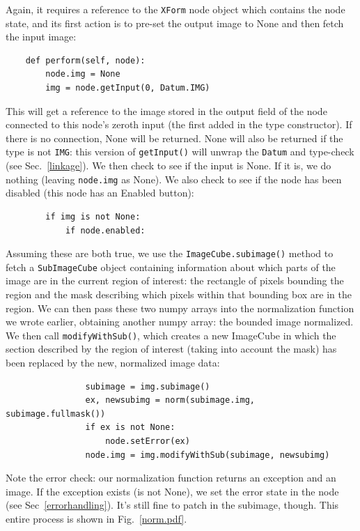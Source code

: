 Again, it requires a reference to the
\texttt{XForm} node object which contains the node state, and its first action
is to pre-set the output image to None and then fetch the input image:
\begin{lstlisting}
    def perform(self, node):
        node.img = None    
        img = node.getInput(0, Datum.IMG)
\end{lstlisting}
This will get a reference to the image stored in the output field of the node
connected to this node's zeroth input (the first added in the type
constructor). If there is no connection, None will be returned. None will also
be returned if the type is not \texttt{IMG}: this version of \texttt{getInput()} will
unwrap the \texttt{Datum} and type-check (see Sec.~\ref{linkage}). We then check to see if the input
is None. If it is, we do nothing (leaving \texttt{node.img} as None). We also
check to see if the node has been disabled (this node has an Enabled button):
\begin{lstlisting}
        if img is not None:
            if node.enabled:
\end{lstlisting}
Assuming these are both true, we use the \texttt{ImageCube.subimage()} method to fetch
a \texttt{SubImageCube} object containing information about which parts of the image are
in the current region of interest: the rectangle of pixels bounding the region and the mask
describing which pixels within that bounding box are in the region. We can then pass these two numpy
arrays into the normalization function we wrote earlier, obtaining another numpy array: the 
bounded image normalized. We then call \texttt{modifyWithSub()}, which creates a new ImageCube
in which the section described by the region of interest (taking into account the mask)
has been replaced by the new, normalized image data:
\begin{lstlisting}
                subimage = img.subimage()
                ex, newsubimg = norm(subimage.img, subimage.fullmask())
                if ex is not None:
                    node.setError(ex)
                node.img = img.modifyWithSub(subimage, newsubimg)
\end{lstlisting}
Note the error check: our normalization function returns an exception and an
image. If the exception exists (is not None), we set the error state in the
node (see Sec~\ref{errorhandling}). It's still fine to patch in the subimage,
though. This entire process is shown in Fig.~\ref{norm.pdf}.

